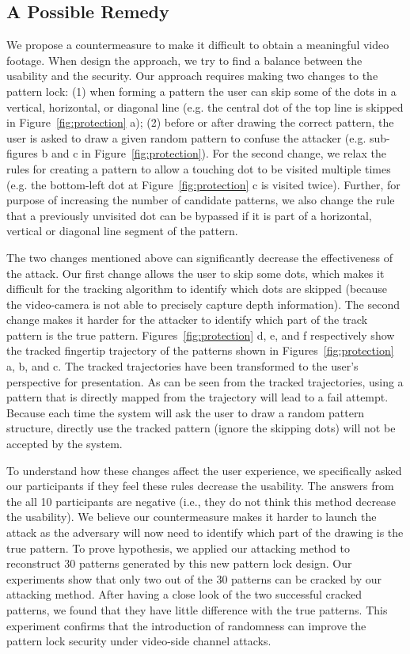 \subsection{A Possible Remedy}
\label{section: potential-remedy}
We propose a countermeasure to make it difficult to obtain a meaningful video footage. When design the approach, we try
to find a balance between the usability and the security. Our approach requires making two  changes to the pattern
lock: (1) when forming a pattern the user can skip some of the dots in a vertical, horizontal, or diagonal line
(e.g. the central dot of the top line is skipped in Figure~\ref{fig:protection} a); (2) before or after drawing the correct pattern, the user is asked to draw a given random
pattern to confuse the attacker (e.g. sub-figures b and c in Figure~\ref{fig:protection}). For the second change, we relax the rules for
creating a pattern to allow a touching dot to be visited multiple times (e.g. the bottom-left dot at
Figure~\ref{fig:protection} c is visited twice). Further, for purpose of increasing the number of candidate
patterns, we also change the rule that a previously unvisited dot can be bypassed if it is part of a horizontal,
vertical or diagonal line segment of the pattern.

The two changes mentioned above can significantly decrease the effectiveness of the attack.
Our first change allows the user to skip some dots, which makes it difficult for the tracking algorithm to identify which dots
are skipped (because the video-camera is not able to precisely capture depth information). The
second change makes it harder for the attacker to identify which part of the track pattern is the true pattern. 
Figures~\ref{fig:protection} d, e, and f respectively show the tracked fingertip trajectory of the 
patterns shown in Figures~\ref{fig:protection} a, b, and c. The tracked trajectories have been 
transformed to the user's perspective for presentation. As can be seen from the tracked trajectories, 
using a pattern that is directly mapped from the trajectory will lead to a fail attempt. Because each time
the system will ask the user to draw a random pattern structure, directly use the tracked pattern (ignore 
the skipping dots) will not be accepted by the system. 


To understand how these changes affect the user experience, we specifically asked our participants if they feel these rules decrease
the usability. The answers from the all 10 participants are negative (i.e., they do not think this method decrease the usability).
We believe our countermeasure makes it harder to launch the attack as the adversary will now need to
identify which part of the drawing is the true pattern.
To prove hypothesis, we applied our attacking method to reconstruct 30 patterns generated by this new pattern lock design.
Our experiments show that only two out of the 30 patterns can be cracked by our attacking method.
After having a close look of the two successful cracked patterns, we found that they have little difference with the true patterns.
This experiment confirms that the introduction of randomness can improve the pattern lock security under video-side channel attacks.

